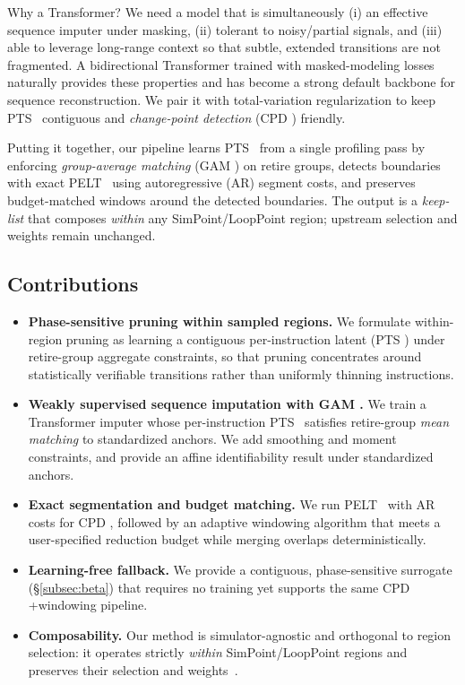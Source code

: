 \documentclass[conference]{IEEEtran}
\newcommand{\pts}{\textsc{PTS} }
\newcommand{\gam}{\textsc{GAM} }
\newcommand{\cpd}{\textsc{CPD} }
\newcommand{\pelt}{\textsc{PELT} }
\begin{document}
Why a Transformer? We need a model that is simultaneously (i) an effective sequence imputer under masking, (ii) tolerant to noisy/partial signals, and (iii) able to leverage long-range context so that subtle, extended transitions are not fragmented. A bidirectional Transformer trained with masked-modeling losses naturally provides these properties and has become a strong default backbone for sequence reconstruction. We pair it with total-variation regularization to keep \pts\ contiguous and \emph{change-point detection} (\cpd) friendly.

Putting it together, our pipeline learns \pts\ from a single profiling pass by enforcing \emph{group-average matching} (\gam) on retire groups, detects boundaries with exact \pelt\ using autoregressive (AR) segment costs, and preserves budget-matched windows around the detected boundaries. The output is a \emph{keep-list} that composes \emph{within} any SimPoint/LoopPoint region; upstream selection and weights remain unchanged.

\subsection*{Contributions}
\begin{itemize}[leftmargin=*,noitemsep,topsep=1pt]
  \item \textbf{Phase-sensitive pruning within sampled regions.} We formulate within-region pruning as learning a contiguous per-instruction latent (\pts) under retire-group aggregate constraints, so that pruning concentrates around statistically verifiable transitions rather than uniformly thinning instructions.
  \item \textbf{Weakly supervised sequence imputation with \gam.} We train a Transformer imputer whose per-instruction \pts\ satisfies retire-group \emph{mean matching} to standardized anchors. We add smoothing and moment constraints, and provide an affine identifiability result under standardized anchors.
  \item \textbf{Exact segmentation and budget matching.} We run \pelt\ with AR costs for \cpd, followed by an adaptive windowing algorithm that meets a user-specified reduction budget while merging overlaps deterministically.
  \item \textbf{Learning-free fallback.} We provide a contiguous, phase-sensitive surrogate (\S\ref{subsec:beta}) that requires no training yet supports the same \cpd+windowing pipeline.
  \item \textbf{Composability.} Our method is simulator-agnostic and orthogonal to region selection: it operates strictly \emph{within} SimPoint/LoopPoint regions and preserves their selection and weights~\cite{simpoint-asplos02,simpoint03,simpoint-howto,looppoint-hpca22}.
\end{itemize}
\end{document}
